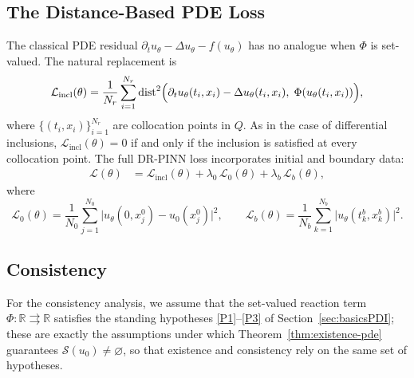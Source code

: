 \documentclass[11pt]{elsarticle}
\theoremstyle{definition}
\theoremstyle{remark}
\numberwithin{equation}{section}
\def\dist{\operatorname{dist}}
\begin{document}
	\subsection{The Distance-Based PDE Loss}
	\label{sec:pde-loss}
	
	The classical PDE residual $\partial_t u_\theta-\Delta u_\theta-f(u_\theta)$
	has no analogue when $\Phi$ is set-valued.  The natural replacement is
	\begin{equation}\label{eq:pde-distance-loss}
		\mathcal{L}_{\mathrm{incl}}(\theta)
		=
		\frac{1}{N_r}
		\sum_{i=1}^{N_r}
		\dist^2\Bigl(
		\partial_t u_\theta(t_i,x_i)-\Delta u_\theta(t_i,x_i),\;
		\Phi(u_\theta(t_i,x_i))
		\Bigr),
	\end{equation}
	where $\{(t_i,x_i)\}_{i=1}^{N_r}$ are collocation points in $Q$.  As in
	the case of differential inclusions, $\mathcal{L}_{\mathrm{incl}}(\theta)=0$ if and only if the
	inclusion is satisfied at every collocation point.  The full DR-PINN loss
	incorporates initial and boundary data:
	\begin{align*}
		\mathcal{L}(\theta)
		&=
		\mathcal{L}_{\mathrm{incl}}(\theta)
		+
		\lambda_0\,\mathcal{L}_0(\theta)
		+
		\lambda_b\,\mathcal{L}_b(\theta),
	\end{align*}
	where
	\[
	\mathcal{L}_0(\theta)
	=
	\frac{1}{N_0}\sum_{j=1}^{N_0}\bigl|u_\theta(0,x_j^0)-u_0(x_j^0)\bigr|^2,
	\qquad
	\mathcal{L}_b(\theta)
	=
	\frac{1}{N_b}\sum_{k=1}^{N_b}\bigl|u_\theta(t_k^b,x_k^b)\bigr|^2.
	\]
	
	\subsection{Consistency}
	\label{sec:pde-consistency}
	For the consistency analysis, we assume that the set-valued reaction
	term $\Phi:\mathbb{R}\rightrightarrows\mathbb{R}$ satisfies the
	standing hypotheses \ref{P1}--\ref{P3} of Section~\ref{sec:basicsPDI};
	these are exactly the assumptions under which
	Theorem~\ref{thm:existence-pde} guarantees
	$\mathcal{S}(u_0)\neq\varnothing$, so that existence and consistency
	rely on the same set of hypotheses.

\end{document}
